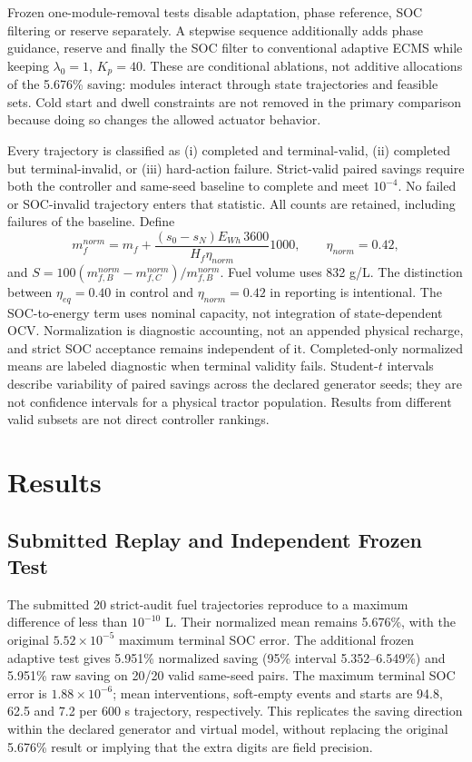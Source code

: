 \documentclass[energies,article,submit,moreauthors]{Definitions/mdpi}
\begin{document}
Frozen one-module-removal tests disable adaptation, phase reference, SOC filtering or reserve separately. A stepwise sequence additionally adds phase guidance, reserve and finally the SOC filter to conventional adaptive ECMS while keeping $\lambda_0=1$, $K_p=40$. These are conditional ablations, not additive allocations of the 5.676\% saving: modules interact through state trajectories and feasible sets. Cold start and dwell constraints are not removed in the primary comparison because doing so changes the allowed actuator behavior.

Every trajectory is classified as (i) completed and terminal-valid, (ii) completed but terminal-invalid, or (iii) hard-action failure. Strict-valid paired savings require both the controller and same-seed baseline to complete and meet $10^{-4}$. No failed or SOC-invalid trajectory enters that statistic. All counts are retained, including failures of the baseline. Define
\begin{equation}
 m_f^{norm}=m_f+\frac{(s_0-s_N)E_{Wh}\,3600}{H_f\eta_{norm}}1000,
 \qquad \eta_{norm}=0.42,
\end{equation}
and $S=100(m_{f,B}^{norm}-m_{f,C}^{norm})/m_{f,B}^{norm}$. Fuel volume uses 832 g/L. The distinction between $\eta_{eq}=0.40$ in control and $\eta_{norm}=0.42$ in reporting is intentional. The SOC-to-energy term uses nominal capacity, not integration of state-dependent OCV. Normalization is diagnostic accounting, not an appended physical recharge, and strict SOC acceptance remains independent of it. Completed-only normalized means are labeled diagnostic when terminal validity fails. Student-$t$ intervals describe variability of paired savings across the declared generator seeds; they are not confidence intervals for a physical tractor population. Results from different valid subsets are not direct controller rankings.

\section{Results}
\subsection{Submitted Replay and Independent Frozen Test}
The submitted 20 strict-audit fuel trajectories reproduce to a maximum difference of less than $10^{-10}$ L. Their normalized mean remains 5.676\%, with the original $5.52\times10^{-5}$ maximum terminal SOC error. The additional frozen adaptive test gives 5.951\% normalized saving (95\% interval 5.352--6.549\%) and 5.951\% raw saving on 20/20 valid same-seed pairs. The maximum terminal SOC error is $1.88\times10^{-6}$; mean interventions, soft-empty events and starts are 94.8, 62.5 and 7.2 per 600 s trajectory, respectively. This replicates the saving direction within the declared generator and virtual model, without replacing the original 5.676\% result or implying that the extra digits are field precision.
\end{document}
